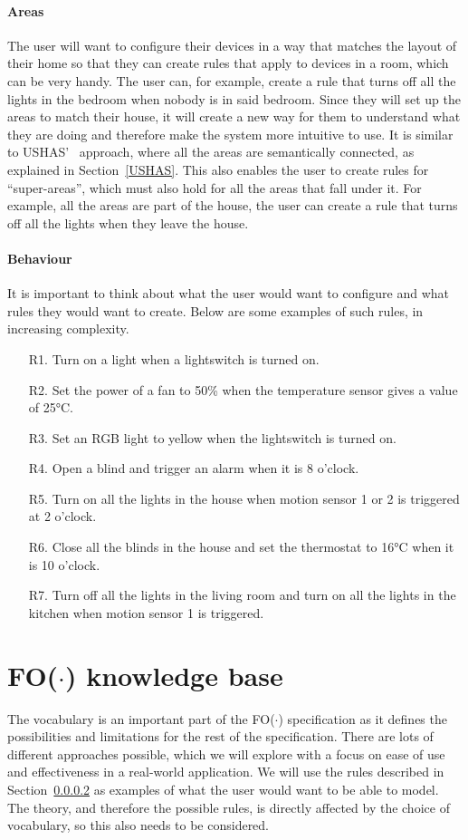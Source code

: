 \documentclass[11pt,a4paper]{report}
\newcommand{\fodot}{FO($\cdot$)\xspace}
\begin{document}
\paragraph{Areas}
The user will want to configure their devices in a way that matches the layout of their home so that they can create rules that apply to devices in a room, which can be very handy. The user can, for example, create a rule that turns off all the lights in the bedroom when nobody is in said bedroom. Since they will set up the areas to match their house, it will create a new way for them to understand what they are doing and therefore make the system more intuitive to use. It is similar to USHAS'~\cite{SOTA_AutomationConfigurationSmarthome} approach, where all the areas are semantically connected, as explained in Section~\ref{USHAS}. This also enables the user to create rules for ``super-areas'', which must also hold for all the areas that fall under it. For example, all the areas are part of the house, the user can create a rule that turns off all the lights when they leave the house.

\paragraph{Behaviour}
\label{Behaviour}
It is important to think about what the user would want to configure and what rules they would want to create. Below are some examples of such rules, in increasing complexity.
\begin{enumerate}
    \item[R1.] Turn on a light when a lightswitch is turned on.
    \item[R2.] Set the power of a fan to 50\% when the temperature sensor gives a value of 25°C.
    \item[R3.] Set an RGB light to yellow when the lightswitch is turned on.
    \item[R4.] Open a blind and trigger an alarm when it is 8 o'clock.
    \item[R5.] Turn on all the lights in the house when motion sensor 1 or 2 is triggered at 2 o'clock.
    \item[R6.] Close all the blinds in the house and set the thermostat to 16°C when it is 10 o'clock.
    \item[R7.] Turn off all the lights in the living room and turn on all the lights in the kitchen when motion sensor 1 is triggered.
\end{enumerate}

\section{\fodot knowledge base} 
\label{fodot_knowledge_base} 
The vocabulary is an important part of the \fodot specification as it defines the possibilities and limitations for the rest of the specification. There are lots of different approaches possible, which we will explore with a focus on ease of use and effectiveness in a real-world application. We will use the rules described in Section~\ref{Behaviour} as examples of what the user would want to be able to model. The theory, and therefore the possible rules, is directly affected by the choice of vocabulary, so this also needs to be considered.
\end{document}
